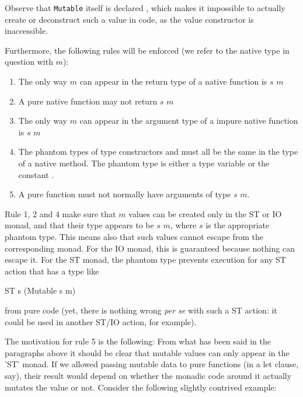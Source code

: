 Observe that \texttt{Mutable} itself is declared , which makes it impossible to actually create or deconstruct such a value in \frege{} code, as the value constructor is inaccessible.

Furthermore, the following rules will be enforced (we refer to the native type in question with $m$):

\begin{enumerate}
\item The only way $m$ can appear in the return type of a native function is  $s$ $m$
\item A pure native function may not return  $s$ $m$
\item The only way $m$ can appear in the argument type of a impure native function is  $s$ $m$
\item The phantom types of type constructors  and  must all be the same in the type of a native method. The phantom type is either a type variable or the constant .
\item A pure function must not normally have arguments of type  $s$ $m$.
\end{enumerate}

Rule 1, 2 and 4 make sure that $m$ values can be created only in the ST or IO monad, and that their type appears to be  $s$ $m$, where $s$ is the appropriate phantom type. This means also that such values cannot escape from the corresponding monad. For the IO monad, this is guaranteed because nothing can escape it. For the ST monad, the phantom type prevents execution for any ST action that has a type like

\begin{code}
ST s (Mutable s m)
\end{code}

from pure code (yet, there is nothing wrong \emph{per se} with such a ST action: it could be used in another ST/IO action, for example).

The motivation for rule 5 is the following: From what has been said in the paragraphs above it should be clear that mutable values can only appear in the 'ST' monad. If we allowed passing mutable data to pure functions (in a let clause, say), their result would depend on whether the monadic code around it actually mutates the value or not. Consider the following slightly contrived example:

